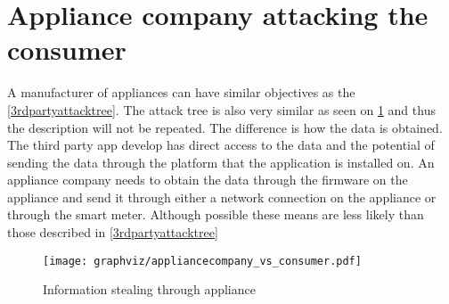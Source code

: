 
\section{Appliance company attacking the consumer}
A manufacturer of appliances can have similar objectives as the \cref{3rdpartyattacktree}.
The attack tree is also very similar as seen on \cref{applianceCompanyTree} and thus the description will not be repeated.
The difference is how the data is obtained.
The third party app develop has direct access to the data and the potential of sending the data through the platform that the application is installed on.
An appliance company needs to obtain the data through the firmware on the appliance and send it through either a network connection on the appliance or through the smart meter.
Although possible these means are less likely than those described in \cref{3rdpartyattacktree}

\begin{figure}
  \begin{center}
    \texttt{[image: graphviz/appliancecompany\_vs\_consumer.pdf]}
  \end{center}
  \caption{Information stealing through appliance}
  \label{applianceCompanyTree}
\end{figure}
